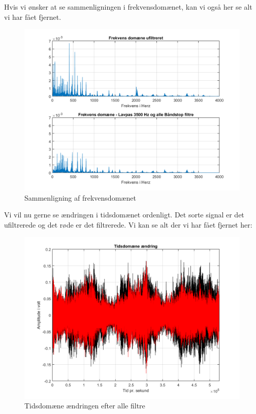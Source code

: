 \documentclass[12pt, letterpaper]{article}
\begin{document}
\newpage
Hvis vi ønsker at se sammenligningen i frekvensdomænet, kan vi også her se alt vi har fået fjernet. 
\begin{figure}[H]
           \includegraphics[width=\linewidth]{billeder/Vinylsamdom}	   							\caption{Sammenligning af frekvensdomænet}
\end{figure}

\newpage
Vi vil nu gerne se ændringen i tidsdomænet ordenligt. Det sorte signal er det ufiltrerede og det røde er det filtrerede. Vi kan se alt der vi har fået fjernet her: 
\begin{figure}[H]
           \includegraphics[width=\linewidth]{billeder/Vinyltidsdo}	   							\caption{Tidsdomæne ændringen efter alle filtre}
\end{figure}
\end{document}
